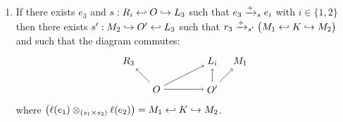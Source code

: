 \begin{lemma}
\begin{enumerate}
  \item If there exists $e_3$ and $s:R_i\hookleftarrow O \hookrightarrow L_3$ such that $e_3\mathrel{\xrightarrow{+}}_s e_i$ with $i\in\{1,2\}$ then there exists $s':M_2\hookrightarrow O'\hookleftarrow L_3$ such that $r_3\mathrel{\xrightarrow{+}}_{s'}\big( M_1\hookleftarrow K\hookrightarrow M_2\big)$ and such that the diagram commutes:
    \[
    \begin{tikzpicture} %
      \node (ri) at (-1,1) {\(R_3\)};
      \node (m2) at (3,1) {\(M_1\)};
      \node (l3) at (2,1) {\(L_i\)};
      \node (o) at (0,0) {\(O\)};
      \node (o1) at (2,0) {\(O'\)};
      \draw [->] (o) -- (o1);
      \draw [->] (o) -- (l3);
      \draw [->] (o1) -- (l3);
      \draw [->] (o) -- (ri);
      \draw [->] (o1) -- (m2);
    \end{tikzpicture}
    \]
    where $\big(\ell(e_1)\otimes_{(s_1\times s_2)} \ell(e_2)\big) = M_1\hookleftarrow K\hookrightarrow M_2$.
  \end{enumerate}
\end{lemma}
